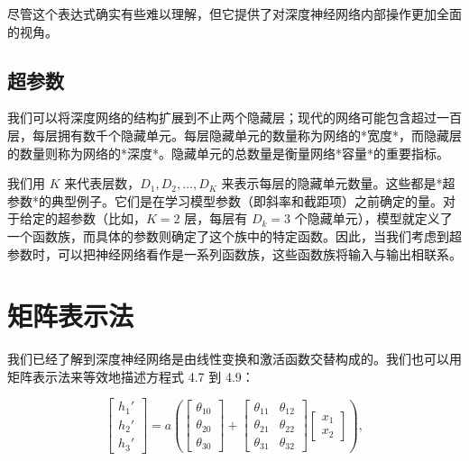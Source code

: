 \documentclass[lang=cn,newtx,10pt,scheme=chinese]{elegantbook}
\begin{document}
尽管这个表达式确实有些难以理解，但它提供了对深度神经网络内部操作更加全面的视角。

\subsection{超参数}

我们可以将深度网络的结构扩展到不止两个隐藏层；现代的网络可能包含超过一百层，每层拥有数千个隐藏单元。每层隐藏单元的数量称为网络的*宽度*，而隐藏层的数量则称为网络的*深度*。隐藏单元的总数量是衡量网络*容量*的重要指标。

我们用 \(K\) 来代表层数，\(D_1, D_2, \ldots, D_K\) 来表示每层的隐藏单元数量。这些都是*超参数*的典型例子。它们是在学习模型参数（即斜率和截距项）之前确定的量。对于给定的超参数（比如，\(K = 2\) 层，每层有 \(D_k = 3\) 个隐藏单元），模型就定义了一个函数族，而具体的参数则确定了这个族中的特定函数。因此，当我们考虑到超参数时，可以把神经网络看作是一系列函数族，这些函数族将输入与输出相联系。

\section{矩阵表示法}
我们已经了解到深度神经网络是由线性变换和激活函数交替构成的。我们也可以用矩阵表示法来等效地描述方程式 4.7 到 4.9：

\begin{equation}
\begin{bmatrix}
	h_1' \\
	h_2' \\
	h_3'
\end{bmatrix}
= a
\left(
\begin{bmatrix}
	\theta_{10} \\
	\theta_{20} \\
	\theta_{30}
\end{bmatrix}
+
\begin{bmatrix}
	\theta_{11} & \theta_{12} \\
	\theta_{21} & \theta_{22} \\
	\theta_{31} & \theta_{32}
\end{bmatrix}
\begin{bmatrix}
	x_1 \\
	x_2
\end{bmatrix}
\right),
\end{equation}
\end{document}
